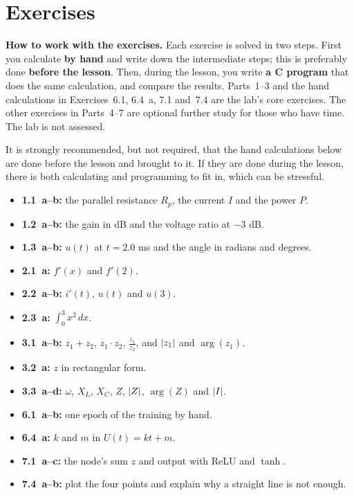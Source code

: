 
\section{Exercises}
\label{c18:sec:uppgifter}

\begin{aside}
\textbf{How to work with the exercises.} Each exercise is solved in two steps. First you calculate
\textbf{by hand} and write down the intermediate steps; this is preferably done \textbf{before the lesson}.
Then, during the lesson, you write \textbf{a C program} that does the same calculation, and
compare the results. Parts~1--3 and the hand calculations in Exercises~6.1, 6.4~a, 7.1 and~7.4 are the lab's
core exercises. The other exercises in Parts~4--7 are optional further study for those who have
time. The lab is not assessed.

\end{aside}

\begin{aside}
\note[Note] It is strongly recommended, but not required, that the hand calculations below are done
before the lesson and brought to it. If they are done during the lesson, there is both calculating
and programming to fit in, which can be stressful.
\begin{itemize}
  \item \textbf{1.1~a--b:} the parallel resistance $R_p$, the current $I$ and the power $P$.
  \item \textbf{1.2~a--b:} the gain in dB and the voltage ratio at $-3$ dB.
  \item \textbf{1.3~a--b:} $u(t)$ at $t = 2.0$ ms and the angle in radians and degrees.
  \item \textbf{2.1~a:} $f'(x)$ and $f'(2)$.
  \item \textbf{2.2~a--b:} $i'(t)$, $u(t)$ and $u(3)$.
  \item \textbf{2.3~a:} $\int_0^3 x^2\,dx$.
  \item \textbf{3.1~a--b:} $z_1 + z_2$, $z_1 \cdot z_2$, $\frac{z_1}{z_2}$, and $\lvert z_1\rvert$ and $\arg(z_1)$.
  \item \textbf{3.2~a:} $z$ in rectangular form.
  \item \textbf{3.3~a--d:} $\omega$, $X_L$, $X_C$, $Z$, $\lvert Z\rvert$, $\arg(Z)$ and $\lvert I\rvert$.
  \item \textbf{6.1~a--b:} one epoch of the training by hand.
  \item \textbf{6.4~a:} $k$ and $m$ in $U(t) = kt + m$.
  \item \textbf{7.1~a--c:} the node's sum $z$ and output with ReLU and $\tanh$.
  \item \textbf{7.4~a--b:} plot the four points and explain why a straight line is not enough.
\end{itemize}
\end{aside}

